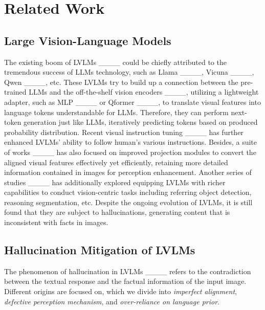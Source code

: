 \section{Related Work}
\label{related work}
\subsection{Large Vision-Language Models}
The existing boom of LVLMs ____ could be chiefly attributed to the tremendous success of LLMs technology, such as Llama ____, Vicuna ____, Qwen ____, etc. These LVLMs try to build up a connection between the pre-trained LLMs and the off-the-shelf vision encoders ____, utilizing a lightweight adapter, such as MLP ____ or Qformer ____, to translate visual features into language tokens understandable for LLMs. Therefore, they can perform next-token generation just like LLMs, iteratively predicting tokens based on produced probability distribution. 
Recent visual instruction tuning ____ has further enhanced LVLMs' ability to follow human's various instructions. Besides, a suite of works ____ has also focused on improved projection modules to convert the aligned visual features effectively yet efficiently, retaining more detailed information contained in images for perception enhancement. Another series of studies ____ has additionally explored equipping LVLMs with richer capabilities to conduct vision-centric tasks including referring object detection, reasoning segmentation, etc. Despite the ongoing evolution of LVLMs, it is still found that they are subject to hallucinations, generating content that is inconsistent with facts in images. 

\subsection{Hallucination Mitigation of LVLMs}
The phenomenon of hallucination in LVLMs ____ refers to the contradiction between the textual response and the factual information of the input image. Different origins are focused on, which we divide into \textit{imperfect alignment}, \textit{defective perception mechanism}, and \textit{over-reliance on language prior}. 

